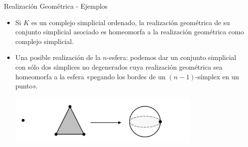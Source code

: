\documentclass[11pt]{beamer}
\newcommand{\N}{\mathbb{N}}
\renewcommand{\ss}[1]{\Delta^{#1}}
\newcommand{\guill}[1]{«#1»}
\newtheorem{defs}{Definición}
\newtheorem{prop}{Proposición}
\newtheorem{lema}{Lema}
\begin{document}
\begin{frame}{Realización Geométrica - Ejemplos}
\begin{itemize}
\item <1-> Si $K$ es un complejo simplicial ordenado, la realización geométrica de su conjunto simplicial asociado es homeomorfa a la realización geométrica como complejo simplicial.
\item <2-> Una posible realización de la $n$-esfera: podemos dar un conjunto simplicial con sólo dos símplices no degenerados cuya realización geométrica sea homeomorfa a la esfera \guill{pegando los bordes de un $(n-1)$-símplex en un punto}.
\begin{center}
\begin{overprint}
\begin{center}
\includegraphics[width=0.75\textwidth]{modelo-simpl-nesfera.png}
\end{center}
\end{overprint}
\end{center}
\end{itemize}
\end{frame}

%
%
%
\end{document}
